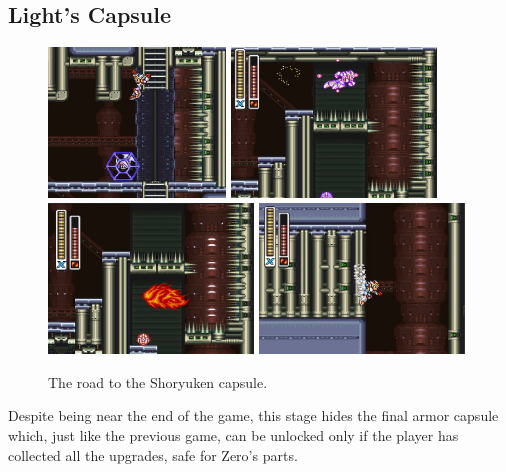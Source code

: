 \subsection{Light's Capsule}\label{X2:Shoryuken}
\begin{figure}[htp]
	\centering
	\includegraphics[height=4cm]{figures/X2/Hunter_stages/Shoryuken_1.png}
	\includegraphics[height=4cm]{figures/X2/Hunter_stages/Shoryuken_2.png}
	\vspace{2pt}
	\includegraphics[height=4cm]{figures/X2/Hunter_stages/Shoryuken_3.png}
	\includegraphics[height=4cm]{figures/X2/Hunter_stages/Shoryuken_4.png}
	\caption{The road to the Shoryuken capsule.}
\end{figure}
Despite being near the end of the game, this stage hides the final armor capsule which, just like the previous game, can be unlocked only if the player has collected all the upgrades, safe for Zero's parts. 

